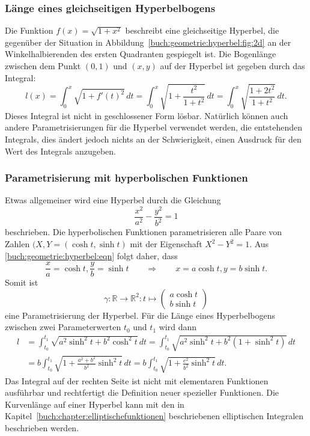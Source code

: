 \subsubsection{Länge eines gleichseitigen Hyperbelbogens}
Die Funktion $f(x)=\sqrt{1+x^2}$ beschreibt eine gleichseitige
Hyperbel, die gegenüber der Situation in
Abbildung~\ref{buch:geometrie:hyperbel:fig:2d}
an der Winkelhalbierenden des ersten Quadranten gespiegelt ist.
Die Bogenlänge zwischen dem Punkt $(0,1)$ und $(x,y)$ auf der
Hyperbel ist gegeben durch das Integral:
\[
l(x)
=
\int_0^x \sqrt{1+f'(t)^2}\,dt
=
\int_0^x \sqrt{1+\frac{t^2}{1+t^2}}\,dt
=
\int_0^x \sqrt{\frac{1+2t^2}{1+t^2}}\,dt.
\]
Dieses Integral ist nicht in geschlossener Form lösbar.
Natürlich können auch andere Parametrisierungen für die Hyperbel
verwendet werden, die entstehenden Integrals, dies ändert jedoch
nichts an der Schwierigkeit, einen Ausdruck für den Wert des
Integrals anzugeben.

\subsubsection{Parametrisierung mit hyperbolischen Funktionen}
Etwas allgemeiner wird eine Hyperbel durch die Gleichung
\begin{equation}
\frac{x^2}{a^2} - \frac{y^2}{b^2} = 1
\label{buch:geometrie:hyperbel:eqn}
\end{equation}
beschrieben.
Die hyperbolischen Funktionen parametrisieren alle Paare von Zahlen
$(X,Y=(\cosh t,\sinh t)$ mit der Eigenschaft $X^2-Y^2=1$.
Aus \eqref{buch:geometrie:hyperbel:eqn} folgt daher, dass
\[
\frac{x}{a} = \cosh t, \frac{y}{b} = \sinh t
\qquad\Rightarrow\qquad
x=a\cosh t, y=b\sinh t.
\]
Somit ist 
\[
\gamma\colon
\mathbb{R}\to\mathbb{R}^2
:
t\mapsto \begin{pmatrix}a\cosh t\\b\sinh t\end{pmatrix}
\]
eine Parametrisierung der Hyperbel.
Für die Länge eines Hyperbelbogens zwischen zwei Parameterwerten
$t_0$ und $t_1$ wird dann
\begin{align*}
l
&=
\int_{t_0}^{t_1}
\sqrt{a^2 \sinh^2 t + b^2 \cosh^2 t}
\,dt
=
\int_{t_0}^{t_1}
\sqrt{a^2 \sinh^2 t + b^2 (1+\sinh^2 t)}
\,dt
\\
&=
b
\int_{t_0}^{t_1}
\sqrt{1 + \frac{a^2+b^2}{b^2} \sinh^2 t }
\,dt
=
b
\int_{t_0}^{t_1}
\sqrt{1 + \frac{e^2}{b^2} \sinh^2 t }
\,dt.
\end{align*}
Das Integral auf der rechten Seite ist nicht mit elementaren Funktionen
ausführbar und rechtfertigt die Definition neuer spezieller Funktionen.
Die Kurvenlänge auf einer Hyperbel kann mit den in
Kapitel~\ref{buch:chapter:elliptischefunktionen}
beschriebenen elliptischen Integralen beschrieben werden.

